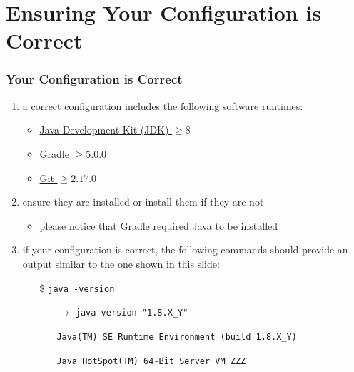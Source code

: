 \documentclass[handout]{beamer}\mode<presentation>{\usetheme{AMSCesenaPurpleAndGold}}
\begin{document}
\section{Ensuring Your Configuration is Correct}

\begin{frame}[c,allowframebreaks]
\frametitle{Your Configuration is Correct}

	\begin{enumerate}

    \item a correct configuration includes the following software runtimes:
    \begin{itemize}
        \item \href{http://www.oracle.com/technetwork/java/javase/downloads/jdk8-downloads-2133151.html}{Java Development Kit (JDK) $\geq 8$} 
        \item \href{https://gradle.org/releases}{Gradle $\geq 5.0.0$}
        \item \href{https://git-scm.com}{Git $\geq 2.17.0$}
    \end{itemize}

	\item ensure they are installed or install them if they are not
	\begin{itemize}
		\item please notice that Gradle required Java to be installed
	\end{itemize}
    
    \framebreak
    
    \item if your configuration is correct, the following commands should provide an output similar to the one shown in this slide:
    \begin{itemize}
        \item[\$] \texttt{java -version}
        \begin{itemize}
            \item[$\rightarrow$] \texttt{java version "1.8.X\_Y"}
            \item[] \texttt{Java(TM) SE Runtime Environment (build 1.8.X\_Y)}
            \item[] \texttt{Java HotSpot(TM) 64-Bit Server VM ZZZ}
        \end{itemize}
        

\end{itemize}
\end{enumerate}
\end{frame}
\end{document}
